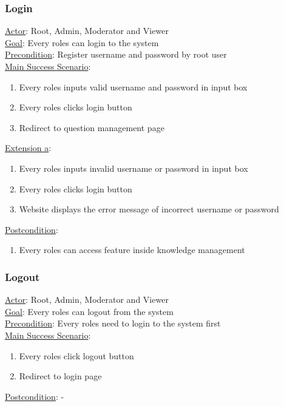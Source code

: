 \documentclass[12pt,oneside,openright,a4paper]{cpe-english-project}
\begin{document}
	\subsubsection{Login}
	\underline{Actor}: Root, Admin, Moderator and Viewer\\
	\underline{Goal}: Every roles can login to the system\\
	\underline{Precondition}: Register username and password by root user\\
	\underline{Main Success Scenario}:
	\begin{enumerate}[label={\arabic*.}]
		\item Every roles inputs valid username and password in input box        
		\item Every roles clicks login button
		\item Redirect to question management page
	\end{enumerate}
	\underline{Extension a}:
	\begin{enumerate}[label={\arabic*.}]
		\item Every roles inputs invalid username or password in input box        
		\item Every roles clicks login button
		\item Website displays the error message of incorrect username or password
	\end{enumerate}
	\underline{Postcondition}: 
	\begin{enumerate}[label={\arabic*.}]
		\item Every roles can access feature inside knowledge management
	\end{enumerate}

	\subsubsection{Logout}
	\underline{Actor}: Root, Admin, Moderator and Viewer\\
	\underline{Goal}: Every roles can logout from the system\\
	\underline{Precondition}: Every roles need to login to the system first\\
	\underline{Main Success Scenario}:
	\begin{enumerate}[label={\arabic*.}]
		\item Every roles click logout button      
		\item Redirect to login page
	\end{enumerate}
	\underline{Postcondition}: -
\end{document}
